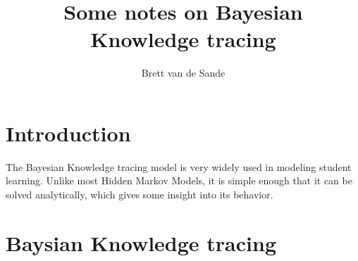 \documentclass[11pt,letterpaper]{article}
\begin{document}
\title{Some notes on Bayesian Knowledge tracing}
\author{Brett van de Sande}
\maketitle

\section{Introduction}

The Bayesian Knowledge tracing model is very widely used in
modeling student learning.  Unlike most Hidden Markov Models,
it is simple enough that it can be solved analytically, which
gives some insight into its behavior.

\section{Baysian Knowledge tracing}
\end{document}
